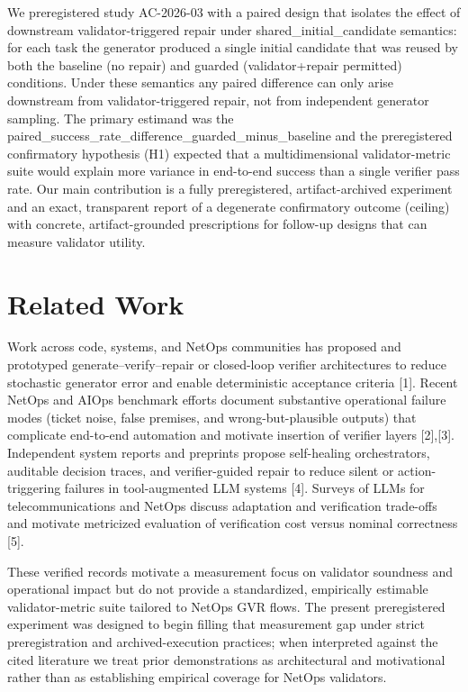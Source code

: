 \documentclass[conference]{IEEEtran}
\begin{document}
We preregistered study AC-2026-03 with a paired design that isolates the effect of downstream validator-triggered repair under shared\_initial\_candidate semantics: for each task the generator produced a single initial candidate that was reused by both the baseline (no repair) and guarded (validator+repair permitted) conditions. Under these semantics any paired difference can only arise downstream from validator-triggered repair, not from independent generator sampling. The primary estimand was the paired\_success\_rate\_difference\_guarded\_minus\_baseline and the preregistered confirmatory hypothesis (H1) expected that a multidimensional validator-metric suite would explain more variance in end-to-end success than a single verifier pass rate. Our main contribution is a fully preregistered, artifact-archived experiment and an exact, transparent report of a degenerate confirmatory outcome (ceiling) with concrete, artifact-grounded prescriptions for follow-up designs that can measure validator utility.

\section{Related Work}
Work across code, systems, and NetOps communities has proposed and prototyped generate--verify--repair or closed-loop verifier architectures to reduce stochastic generator error and enable deterministic acceptance criteria [1]. Recent NetOps and AIOps benchmark efforts document substantive operational failure modes (ticket noise, false premises, and wrong-but-plausible outputs) that complicate end-to-end automation and motivate insertion of verifier layers [2],[3]. Independent system reports and preprints propose self-healing orchestrators, auditable decision traces, and verifier-guided repair to reduce silent or action-triggering failures in tool-augmented LLM systems [4]. Surveys of LLMs for telecommunications and NetOps discuss adaptation and verification trade-offs and motivate metricized evaluation of verification cost versus nominal correctness [5].

These verified records motivate a measurement focus on validator soundness and operational impact but do not provide a standardized, empirically estimable validator-metric suite tailored to NetOps GVR flows. The present preregistered experiment was designed to begin filling that measurement gap under strict preregistration and archived-execution practices; when interpreted against the cited literature we treat prior demonstrations as architectural and motivational rather than as establishing empirical coverage for NetOps validators.
\end{document}
